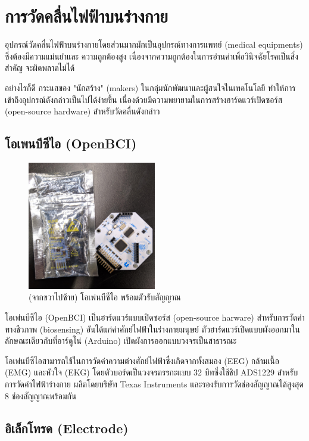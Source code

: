 \section{การวัดคลื่นไฟฟ้าบนร่างกาย}

อุปกรณ์วัดคลื่นไฟฟ้าบนร่างกายโดยส่วนมากมักเป็นอุปกรณ์ทางการแพทย์ (medical equipments) ซึ่งต้องมีความแม่นยำและ
ความถูกต้องสูง เนื่องจากความถูกต้องในการอ่านค่าเพื่อวินิจฉัยโรคเป็นสิ่งสำคัญ จะผิดพลาดไม่ได้

อย่างไรก็ดี กระแสของ "นักสร้าง" (makers) ในกลุ่มนักพัฒนาและผู้สนใจในเทคโนโลยี ทำให้การเข้าถึงอุปกรณ์ดังกล่าวเป็นไปได้ง่ายขึ้น
เนื่องด้วยมีความพยายามในการสร้างฮาร์ดแวร์เปิดซอร์ส (open-source hardware) สำหรับวัดคลื่นดังกล่าว

\subsection{โอเพนบีซีไอ (OpenBCI)}

\begin{figure}[h]
    \centering
    \includegraphics[width=0.5\textwidth]{images/IMG_20190620_155530.jpg}
    \caption{(จากขวาไปซ้าย) โอเพ่นบีซีไอ พร้อมตัวรับสัญญาณ}
\end{figure}

โอเพ่นบีซีไอ (OpenBCI) เป็นฮาร์ดแวร์แบบเปิดซอร์ส (open-source harware) สำหรับการวัดค่าทางชีวภาพ (biosensing)
อันได้แก่ค่าศักย์ไฟฟ้าในร่างกายมนุษย์ ตัวฮาร์ดแวร์เปิดแบบผังออกมาในลักษณะเดียวกับที่อาร์ดูโน่ (Arduino)
เปิดผังการออกแบบวงจรเป็นสาธารณะ

โอเพ่นบีซีไอสามารถใช้ในการวัดค่าความต่างศักย์ไฟฟ้าซึ่งเกิดจากทั้งสมอง (EEG) กล้ามเนื้อ (EMG) และหัวใจ (EKG)
โดยตัวบอร์ดเป็นวงจรตรรกะแบบ 32 บิทซึ่งใช้ชิป ADS1229 สำหรับการวัดค่าไฟฟ้าร่างกาย ผลิตโดยบริษัท Texas Instruments
และรองรับการวัดช่องสัญญาณได้สูงสุด 8 ช่องสัญญาณพร้อมกัน

\subsection{อิเล็กโทรด (Electrode)}

